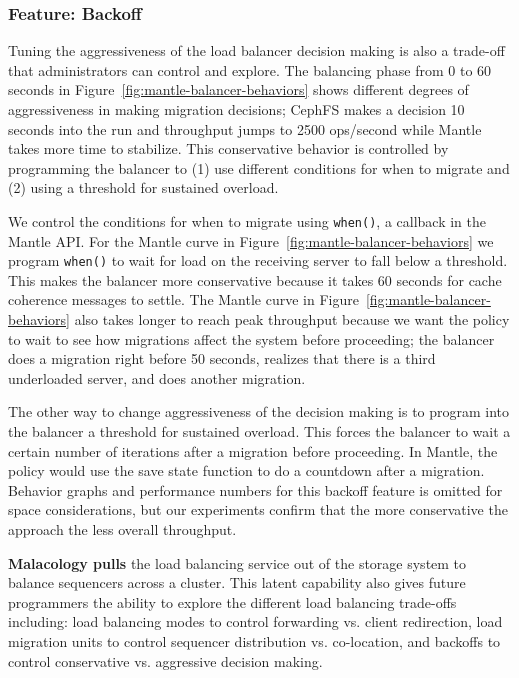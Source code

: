 \subsubsection{Feature: Backoff}
\label{sec:feature-backoff}

Tuning the aggressiveness of the load balancer decision making is also a
trade-off that administrators can control and explore. The balancing phase from
0 to 60 seconds in Figure~\ref{fig:mantle-balancer-behaviors} shows different
degrees of aggressiveness in making migration decisions; CephFS makes a
decision 10 seconds into the run and throughput jumps to 2500 ops/second 
while Mantle takes more time to stabilize. This conservative behavior is
controlled by programming the balancer to (1) use different conditions for when
to migrate and (2) using a threshold for sustained overload. 

We control the conditions for when to migrate using \texttt{when()}, a callback
in the Mantle API.  For the Mantle curve in
Figure~\ref{fig:mantle-balancer-behaviors} we program \texttt{when()} to wait
for load on the receiving server to fall below a threshold. This makes the
balancer more conservative because it takes 60 seconds for cache coherence
messages to settle.  The Mantle curve in
Figure~\ref{fig:mantle-balancer-behaviors} also takes longer to reach peak
throughput because we want the policy to wait to see how migrations affect the
system before proceeding; the balancer does a migration right before 50
seconds, realizes that there is a third underloaded server, and does another
migration. 

The other way to change aggressiveness of the decision making is to program
into the balancer a threshold for sustained overload. This forces the balancer
to wait a certain number of iterations after a migration before proceeding. In
Mantle, the policy would use the save state function to do a countdown after a
migration.  Behavior graphs and performance numbers for this backoff feature is
omitted for space considerations, but our experiments confirm that the more
conservative the approach the less overall throughput.
 
\textbf{Malacology pulls} the load balancing service out of the storage system
to balance sequencers across a cluster. This latent capability also gives
future programmers the ability to explore the different load balancing
trade-offs including: load balancing modes to control forwarding vs. client
redirection, load migration units to control sequencer distribution vs.
co-location, and backoffs to control conservative vs. aggressive decision
making.

